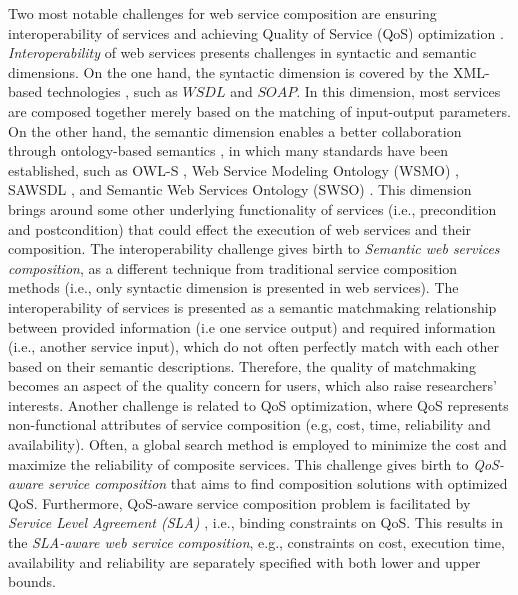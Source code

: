 Two most notable challenges for web service composition are ensuring interoperability of services and achieving Quality of Service (QoS) optimization \cite{fensel2011semantic}. \emph{Interoperability} of web services presents challenges in syntactic and semantic dimensions. On the one hand, the syntactic dimension is covered by the XML-based technologies \cite{yu2008deploying}, such as $WSDL$ and $SOAP$. In this dimension, most services are composed together merely based on the matching of input-output parameters. On the other hand, the semantic dimension enables a better collaboration through ontology-based semantics \cite{o2005review}, in which many standards have been established, such as OWL-S \cite{martin2004owl}, Web Service Modeling Ontology (WSMO) \cite{lausen2005w3c}, SAWSDL \cite{kopecky2007sawsdl}, and Semantic Web Services Ontology (SWSO) \cite{petrie2016web}. This dimension brings around some other underlying functionality of services (i.e., precondition and postcondition) that could effect the execution of web services and their composition. The interoperability challenge gives birth to \emph{Semantic web services composition}, as a different technique from traditional service composition methods (i.e., only syntactic dimension is presented in web services). The interoperability of services is presented as a semantic matchmaking relationship between provided information (i.e one service output) and required information (i.e., another service input), which do not often perfectly match with each other based on their semantic descriptions. Therefore, the quality of matchmaking becomes an aspect of the quality concern for users, which also raise researchers' interests. Another challenge is related to QoS optimization, where QoS represents non-functional attributes of service composition (e.g, cost, time, reliability and availability). Often, a global search method is employed to minimize the cost and maximize the reliability of composite services. This challenge gives birth to \emph{QoS-aware service composition} that aims to find composition solutions with optimized QoS. Furthermore, QoS-aware service composition problem is facilitated by \emph{Service Level Agreement (SLA)} \cite{sahai2002automated}, i.e., binding constraints on QoS. This results in the \emph{SLA-aware web service composition}, e.g., constraints on cost, execution time, availability and reliability are separately specified with both lower and upper bounds.

